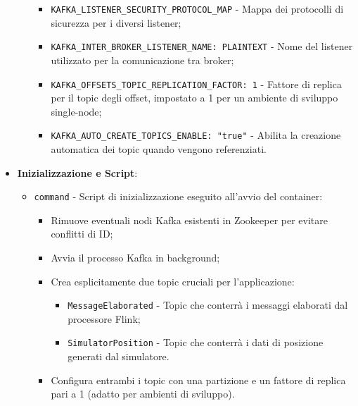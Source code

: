 \documentclass[10pt]{article}
\begin{document}
\begin{itemize}
\begin{itemize}
\begin{itemize}
                \item \texttt{KAFKA\_LISTENER\_SECURITY\_PROTOCOL\_MAP} - Mappa dei protocolli di sicurezza per i diversi listener;
                \item \texttt{KAFKA\_INTER\_BROKER\_LISTENER\_NAME: PLAINTEXT} - Nome del listener utilizzato per la comunicazione tra broker;
                \item \texttt{KAFKA\_OFFSETS\_TOPIC\_REPLICATION\_FACTOR: 1} - Fattore di replica per il topic degli offset, impostato a 1 per un ambiente di sviluppo single-node;
                \item \texttt{KAFKA\_AUTO\_CREATE\_TOPICS\_ENABLE: "true"} - Abilita la creazione automatica dei topic quando vengono referenziati.
            \end{itemize}
        \end{itemize}
        
        \item \textbf{Inizializzazione e Script}:
        \begin{itemize}
            \item \texttt{command} - Script di inizializzazione eseguito all'avvio del container:
            \begin{itemize}
                \item Rimuove eventuali nodi Kafka esistenti in Zookeeper per evitare conflitti di ID;
                \item Avvia il processo Kafka in background;
                \item Crea esplicitamente due topic cruciali per l'applicazione:
                \begin{itemize}
                    \item \texttt{MessageElaborated} - Topic che conterrà i messaggi elaborati dal processore Flink;
                    \item \texttt{SimulatorPosition} - Topic che conterrà i dati di posizione generati dal simulatore.
                \end{itemize}
                \item Configura entrambi i topic con una partizione e un fattore di replica pari a 1 (adatto per ambienti di sviluppo).
            \end{itemize}
        \end{itemize}
        

\end{itemize}
\end{document}
